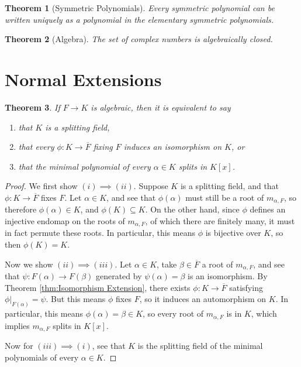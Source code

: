 \documentclass[
    parskip=half,
    toc=flat,
    toc=sectionentrydotfill,
]{scrartcl}  %
\theoremstyle{definition}
\theoremstyle{plain}
\newtheorem{theorem}{Theorem}[section]
\theoremstyle{remark}
\begin{document}
\begin{theorem}[Symmetric Polynomials]
    Every symmetric polynomial can be written uniquely as a polynomial in the elementary symmetric polynomials.
\end{theorem}

\begin{theorem}[Algebra]
    The set of complex numbers is algebraically closed.
\end{theorem}


\section{Normal Extensions}

\begin{theorem}
    If $F\to K$ is algebraic, then it is equivalent to say
    \begin{enumerate}
        \item that $K$ is a splitting field,
        \item that every $\phi:K\to\overline{F}$ fixing $F$ induces an isomorphism on $K$, or
        \item that the minimal polynomial of every $\alpha\in K$ splits in $K[x]$.
    \end{enumerate}
\end{theorem}

\begin{proof}
    We first show $(i)\implies(ii)$.
    Suppose $K$ is a splitting field, and that $\phi:K\to\overline{F}$ fixes $F$.
    Let $\alpha\in K$, and see that $\phi(\alpha)$ must still be a root of $m_{\alpha,F}$, so therefore
    $\phi(\alpha)\in K$, and $\phi(K)\subseteq K$.
    On the other hand, since $\phi$ defines an injective endomap on the roots of $m_{\alpha,F}$, of which there are
    finitely many, it must in fact permute these roots.
    In particular, this means $\phi$ is bijective over $K$, so then $\phi(K)=K$.

    Now we show $(ii)\implies(iii)$.
    Let $\alpha\in K$, take $\beta\in\overline{F}$ a root of $m_{\alpha,F}$, and see that $\psi:F(\alpha)\to F(\beta)$
    generated by $\psi(\alpha)=\beta$ is an isomorphism.
    By Theorem \ref{thm:Isomorphism Extension}, there exists $\phi:K\to\overline{F}$ satisfying
    $\phi\vert_{F(\alpha)}=\psi$.
    But this means $\phi$ fixes $F$, so it induces an automorphism on $K$.
    In particular, this means $\phi(\alpha)=\beta\in K$, so every root of $m_{\alpha,F}$ is in $K$, which implies
    $m_{\alpha,F}$ splits in $K[x]$.

    Now for $(iii)\implies(i)$, see that $K$ is the splitting field of the minimal polynomials of every
    $\alpha\in K$.
\end{proof}
\end{document}
